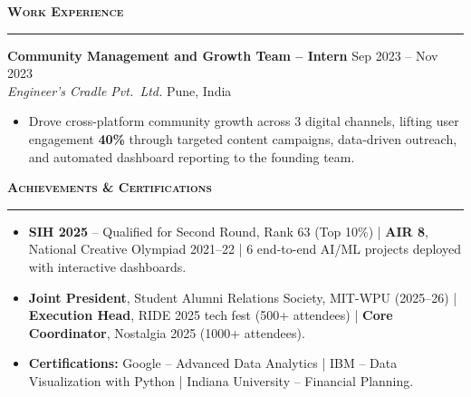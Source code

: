 \documentclass[a4paper,10pt]{article}
\newcommand{\sectionHeader}[2]{%
  \vspace{2.5pt}%
  \noindent%
  {\normalsize\bfseries\color{HeaderDark}#2\enspace\textsc{#1}}%
  \\[-6pt]%
  {\color{SectionLine}\rule{\textwidth}{1pt}}%
  \vspace{1pt}\par%
}
\newcommand{\expEntry}[4]{%
  \vspace{1pt}%
  \noindent\textbf{\color{HeaderDark}#1} \hfill {\small\color{SubText}#2}\\[-3pt]%
  {\small\color{MidGray}\textit{#3}} \hfill {\small\color{SubText}#4}%
  \vspace{0pt}\par%
}
\begin{document}

\sectionHeader{Work Experience}{\faLaptopCode}

\expEntry{Community Management and Growth Team -- Intern}
  {Sep 2023 -- Nov 2023}
  {Engineer's Cradle Pvt.\ Ltd.}
  {Pune, India}

\begin{itemize}[leftmargin=14pt, itemsep=0pt, parsep=0pt, topsep=1pt, label={\color{BulletColor}\textbf{--}}]
  \item {\small Drove cross-platform community growth across 3 digital channels, lifting user engagement \textbf{40\%} through targeted content campaigns, data-driven outreach, and automated dashboard reporting to the founding team.}
\end{itemize}


\sectionHeader{Achievements \& Certifications}{\faTrophy}

\begin{itemize}[leftmargin=14pt, itemsep=0pt, parsep=0pt, topsep=1pt, label={\color{BulletColor}$\bullet$}]
  \item {\small \textbf{SIH 2025} -- Qualified for Second Round, Rank 63 (Top 10\%) {\color{SubText}|} \textbf{AIR 8}, National Creative Olympiad 2021--22 {\color{SubText}|} 6 end-to-end AI/ML projects deployed with interactive dashboards.}
  \item {\small \textbf{Joint President}, Student Alumni Relations Society, MIT-WPU (2025--26) {\color{SubText}|} \textbf{Execution Head}, RIDE 2025 tech fest (500+ attendees) {\color{SubText}|} \textbf{Core Coordinator}, Nostalgia 2025 (1000+ attendees).}
  \item {\small \textbf{Certifications:} Google -- Advanced Data Analytics {\color{SubText}|} IBM -- Data Visualization with Python {\color{SubText}|} Indiana University -- Financial Planning.}
\end{itemize}

\end{document}
